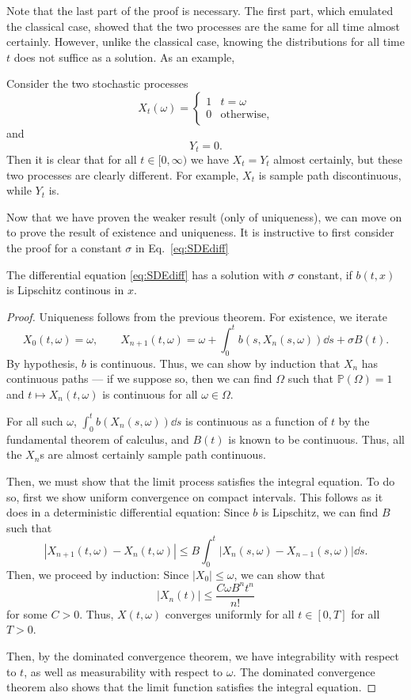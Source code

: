 \documentclass[prb,12pt]{revtex4-2}
\theoremstyle{definition}
\theoremstyle{definition}
\theoremstyle{definition}
\begin{document}
Note that the last part of the proof is necessary. The first part, which emulated the classical case, showed that the two processes are the same for all time almost certainly. However, unlike the classical case, knowing the distributions for all time $t$ does not suffice as a solution. As an example,
\begin{Example}
	Consider the two stochastic processes
	\[
	X_t(\omega) = \begin{cases}
		1 & t = \omega\\
		0  & \text{otherwise,}
	\end{cases}
	\]
	and
	\[
	Y_t=0
	.\] 
	Then it is clear that for all $t\in [0,\infty)$ we have $X_t=Y_t$ almost certainly, but these two processes are clearly different. For example, $X_t$ is sample path discontinuous, while $Y_t$ is.
\end{Example}
Now that we have proven the weaker result (only of uniqueness), we can move on to prove the result of existence and uniqueness. It is instructive to first consider the proof for a constant $\sigma$ in Eq.~\eqref{eq:SDEdiff}
\begin{Theorem}
	The differential equation \eqref{eq:SDEdiff} has a solution with $\sigma$ constant, if $b(t, x)$ is Lipschitz continous in $x$.
\end{Theorem}
\begin{proof}
	Uniqueness follows from the previous theorem. For existence, we iterate
	\[
	X_0(t, \omega)=\omega,\qquad X_{n+1}(t, \omega)=\omega+\int_0^t b(s, X_n(s, \omega))\dd{s}+\sigma B(t)
	.\] 
	By hypothesis, $b$ is continuous. Thus, we can show by induction that $X_n$ has continuous paths --- if we suppose so, then we can find $\Omega$ such that $\mathbb{P}(\Omega)=1$ and $t\mapsto X_n(t, \omega)$ is continuous for all $\omega\in \Omega$. 

	For all such $\omega$, $\int_0^t b(X_n(s, \omega))\dd{s}$ is continuous as a function of $t$ by the fundamental theorem of calculus, and $B(t)$ is known to be continuous. Thus, all the $X_n$s are almost certainly sample path continuous.

	Then, we must show that the limit process satisfies the integral equation. To do so, first we show uniform convergence on compact intervals. This follows as it does in a deterministic differential equation: Since $b$ is Lipschitz, we can find $B$ such that
	\[
	|X_{n+1}(t, \omega)-X_n(t, \omega)| \le B \int_0^t |X_n(s, \omega) - X_{n-1}(s, \omega)|\dd{s} 
	.\] 
	Then, we proceed by induction: Since $|X_0|\le \omega$, we can show that
	\[
	|X_n(t)| \le \frac{C \omega B^n t^n}{n!}
	\]
	for some $C>0$. Thus, $X(t, \omega)$ converges uniformly for all $t\in [0,T]$ for all $T>0$. 

	Then, by the dominated convergence theorem, we have integrability with respect to $t$, as well as measurability with respect to $\omega$. The dominated convergence theorem also shows that the limit function satisfies the integral equation.
\end{proof}
\end{document}
